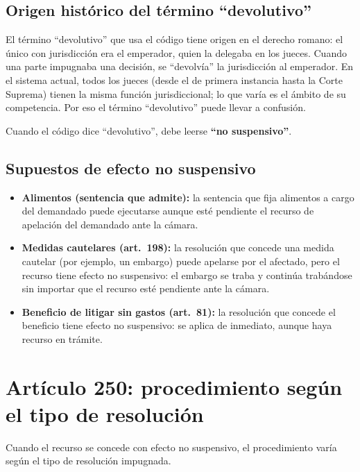 \documentclass[12pt,oneside]{book}
\begin{document}
\subsection{Origen hist\'orico del t\'ermino ``devolutivo''}

El t\'ermino ``devolutivo'' que usa el c\'odigo tiene origen en el derecho romano: el \'unico con jurisdicci\'on era el emperador, quien la delegaba en los jueces. Cuando una parte impugnaba una decisi\'on, se ``devolv\'ia'' la jurisdicci\'on al emperador. En el sistema actual, todos los jueces (desde el de primera instancia hasta la Corte Suprema) tienen la misma funci\'on jurisdiccional; lo que var\'ia es el \'ambito de su competencia. Por eso el t\'ermino ``devolutivo'' puede llevar a confusi\'on.

\begin{important}
Cuando el c\'odigo dice ``devolutivo'', debe leerse \textbf{``no suspensivo''}.
\end{important}

\subsection{Supuestos de efecto no suspensivo}

\begin{itemize}
    \item \textbf{Alimentos (sentencia que admite):} la sentencia que fija alimentos a cargo del demandado puede ejecutarse aunque est\'e pendiente el recurso de apelaci\'on del demandado ante la c\'amara.
    \item \textbf{Medidas cautelares (art.~198):} la resoluci\'on que concede una medida cautelar (por ejemplo, un embargo) puede apelarse por el afectado, pero el recurso tiene efecto no suspensivo: el embargo se traba y contin\'ua trab\'andose sin importar que el recurso est\'e pendiente ante la c\'amara.
    \item \textbf{Beneficio de litigar sin gastos (art.~81):} la resoluci\'on que concede el beneficio tiene efecto no suspensivo: se aplica de inmediato, aunque haya recurso en tr\'amite.
\end{itemize}

\section{Art\'iculo 250: procedimiento seg\'un el tipo de resoluci\'on}

Cuando el recurso se concede con efecto no suspensivo, el procedimiento var\'ia seg\'un el tipo de resoluci\'on impugnada.
\end{document}
